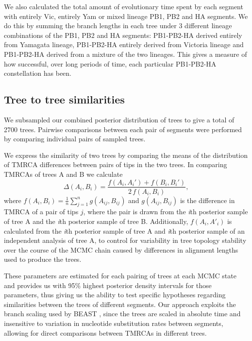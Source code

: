 \documentclass[11pt,oneside,letterpaper]{article}
\begin{document}
We also calculated the total amount of evolutionary time spent by each segment with entirely Vic, entirely Yam or mixed lineage PB1, PB2 and HA segments.
We do this by summing the branch lengths in each tree under 3 different lineage combinations of the PB1, PB2 and HA segments: PB1-PB2-HA derived entirely from Yamagata lineage, PB1-PB2-HA entirely derived from Victoria lineage and PB1-PB2-HA derived from a mixture of the two lineages.
This gives a measure of how successful, over long periods of time, each particular PB1-PB2-HA constellation has been.

\subsection*{Tree to tree similarities}
We subsampled our combined posterior distribution of trees to give a total of 2700 trees.
Pairwise comparisons between each pair of segments were performed by comparing individual pairs of sampled trees.

We express the similarity of two trees by comparing the means of the distribution of TMRCA differences between pairs of tips in the two trees.
In comparing TMRCAs of trees A and B we calculate
\begin{equation}
\Delta(A_i, B_i) = \frac{f(A_i, A_i') + f(B_i, B_i')}{2 \, f(A_i, B_i)},
\end{equation}
where $f(A_i, B_i) = \frac{1}{n}\sum_{j=1}^n g(A_{ij}, B_{ij})$ and $g(A_{ij},B_{ij})$ is the difference in TMRCA of a pair of tips $j$, where the pair is drawn from the \textit{i}th posterior sample of tree A and the \textit{i}th posterior sample of tree B.
Additionally, $f(A_i,A'_i)$ is calculated from the \textit{i}th posterior sample of tree A and \textit{i}th posterior sample of an independent analysis of tree A, to control for variability in tree topology stability over the course of the MCMC chain caused by differences in alignment lengths used to produce the trees.

These parameters are estimated for each pairing of trees at each MCMC state and provides us with 95\% highest posterior density intervals for those parameters, thus giving us the ability to test specific hypotheses regarding similarities between the trees of different segments.
Our approach exploits the branch scaling used by BEAST \cite{drummond2012}, since the trees are scaled in absolute time and insensitive to variation in nucleotide substitution rates between segments, allowing for direct comparisons between TMRCAs in different trees.
\end{document}
